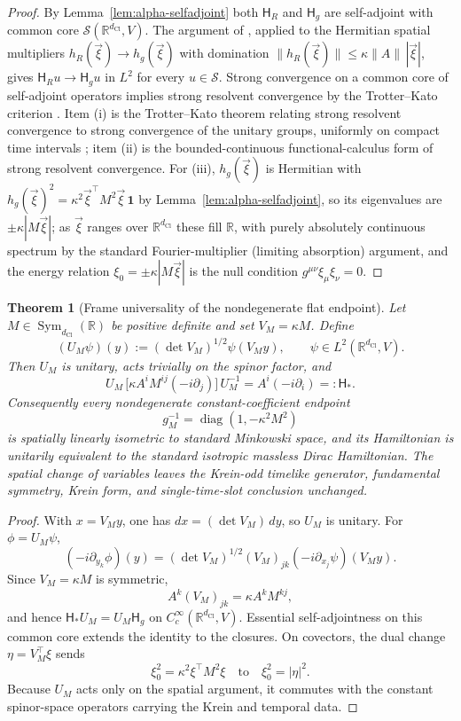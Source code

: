 \documentclass[11pt]{article}
\newtheorem{theorem}{Theorem}[section]
\theoremstyle{definition}
\theoremstyle{remark}
\newcommand{\R}{\mathbb{R}}
\newcommand{\dCl}{d_{\mathrm{Cl}}}
\newcommand{\one}{\mathbf{1}}
\newcommand{\Sch}{\mathcal{S}}
\newcommand{\Ham}{\mathsf{H}}
\newcommand{\norm}[1]{\lVert#1\rVert}
\begin{document}
\begin{proof}
By Lemma~\ref{lem:alpha-selfadjoint} both $\Ham_R$ and $\Ham_g$ are self-adjoint with
common core $\Sch(\R^{\dCl},V)$.  The argument of , applied to
the Hermitian spatial multipliers $h_R(\vec\xi)\to h_g(\vec\xi)$ with domination
$\norm{h_R(\vec\xi)}\le\kappa\norm{A}\,|\vec\xi|$, gives $\Ham_R u\to\Ham_g u$ in
$L^2$ for every $u\in\Sch$.  Strong convergence on a common core of self-adjoint
operators implies strong resolvent convergence by the Trotter--Kato criterion
\cite[Thm.~VIII.25(a)]{reedsimon1}.  Item (i) is the Trotter--Kato theorem
relating strong resolvent convergence to strong convergence of the unitary groups,
uniformly on compact time intervals \cite[Thm.~VIII.21]{reedsimon1}; item (ii)
is the bounded-continuous functional-calculus form of strong resolvent convergence.  For (iii), $h_g(\vec
\xi)$ is Hermitian with $h_g(\vec\xi)^2=\kappa^2\vec\xi^{\top}M^2\vec\xi\,\one$ by
Lemma~\ref{lem:alpha-selfadjoint}, so its eigenvalues are $\pm\kappa|M\vec\xi|$; as
$\vec\xi$ ranges over $\R^{\dCl}$ these fill $\R$, with purely absolutely continuous
spectrum by the standard Fourier-multiplier (limiting absorption) argument, and
the energy relation $\xi_0=\pm\kappa|M\vec\xi|$ is the null condition
$g^{\mu\nu}\xi_\mu\xi_\nu=0$.
\end{proof}

\begin{theorem}[Frame universality of the nondegenerate flat endpoint]
\label{thm:frame-universality}
Let \(M\in\operatorname{Sym}_{\dCl}(\R)\) be positive definite and set
\(V_M=\kappa M\).  Define
\[
  (U_M\psi)(y):=(\det V_M)^{1/2}\psi(V_My),
  \qquad
  \psi\in L^2(\R^{\dCl},V).
\]
Then \(U_M\) is unitary, acts trivially on the spinor factor, and
\[
  U_M\,\bigl[\kappa A^iM^{ij}(-i\partial_j)\bigr]\,U_M^{-1}
  =A^i(-i\partial_i)=:\Ham_* .
\]
Consequently every nondegenerate constant-coefficient endpoint
\[
  g_M^{-1}=\operatorname{diag}(1,-\kappa^2M^2)
\]
is spatially linearly isometric to standard Minkowski space, and its Hamiltonian
is unitarily equivalent to the standard isotropic massless Dirac Hamiltonian.
The spatial change of variables leaves the Krein-odd timelike generator,
fundamental symmetry, Krein form, and single-time-slot conclusion unchanged.
\end{theorem}

\begin{proof}
With \(x=V_My\), one has \(dx=(\det V_M)\,dy\), so \(U_M\) is unitary.
For \(\phi=U_M\psi\),
\[
 (-i\partial_{y_k}\phi)(y)
 =(\det V_M)^{1/2}(V_M)_{jk}
   (-i\partial_{x_j}\psi)(V_My).
\]
Since \(V_M=\kappa M\) is symmetric,
\[
 A^k(V_M)_{jk}
 =\kappa A^kM^{kj},
\]
and hence \(\Ham_*U_M=U_M\Ham_g\) on
\(C_c^\infty(\R^{\dCl},V)\).  Essential self-adjointness on this common core
extends the identity to the closures.  On covectors, the dual change
\(\eta=V_M^\top\xi\) sends
\[
 \xi_0^2=\kappa^2\xi^\top M^2\xi
 \quad\text{to}\quad
 \xi_0^2=|\eta|^2.
\]
Because \(U_M\) acts only on the spatial argument, it commutes with the constant
spinor-space operators carrying the Krein and temporal data.
\end{proof}
\end{document}
